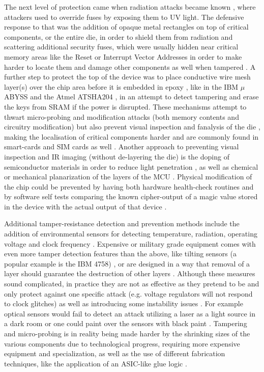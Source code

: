 The next level of protection came when radiation attacks became known \citep{sergei:thesis}, where attackers used to override fuses by exposing them to UV light. The defensive response to that was the addition of opaque metal rectangles on top of critical components, or the entire die, in order to shield them from radiation and scattering additional security fuses, which were usually hidden near critical memory areas like the Reset or Interrupt Vector Addresses in order to make harder to locate them and damage other components as well when tampered \citep{sergei:thesis} \citep{hwre}. A further step to protect the top of the device was to place conductive wire mesh layer(s) over the chip area before it is embedded in epoxy , like in the IBM $\mu$ABYSS \citep{website:ibm_secure} and the Atmel ATSHA204 \citep{hwre}, in an attempt to detect tampering and erase the keys from SRAM if the power is disrupted. These mechanisms attempt to thwart micro-probing and modification attacks (both memory contents and circuitry modification)  but also prevent visual inspection and fanalysis of the die \citep{hwre}, making the localisation of critical components harder and are commonly found in smart-cards \citep{sergei:thesis} and SIM cards as well \citep{hwre}. Another approach to preventing visual inspection and IR imaging (without de-layering the die) is the doping of semiconductor materials in order to reduce light penetration \citep{sergei:thesis}, as well as chemical or mechanical planarization of the layers of the MCU \citep{sergei:thesis} \citep{planarization_techniques}. Physical modification of the chip could be prevented by having both hardware health-check routines and by software self tests comparing the known cipher-output of a magic value stored in the device with the actual output of that device \citep{anderson:tamper_resistance}.

Additional tamper-resistance detection and prevention methods include the addition of environmental sensors for detecting temperature, radiation, operating voltage and clock frequency \citep{sergei:thesis}. Expensive or military grade equipment comes with even more tamper detection features than the above, like tilting sensors (a popular example is the IBM 4758) \citep{website:ibm_secure}, or are designed in a way that removal of a layer should guarantee the destruction of other layers \citep{anderson:cautionary_note}. Although these measures sound complicated, in practice they are not as effective as they pretend to be and only protect against one specific attack (e.g. voltage regulators will not respond to clock glitches) as well as introducing some instability issues \citep{anderson:cautionary_note}. For example optical sensors would fail to detect an attack utilizing a laser as a light source in a dark room \citep{hwre} or one could paint over the sensors with black paint \citep{sergei:thesis}. Tampering and micro-probing is in reality being made harder by the shrinking sizes of the various components due to technological progress, requiring more expensive equipment and specialization, as well as the use of different fabrication techniques, like the application of an ASIC-like glue logic \citep{sergei:thesis} \citep{hwre}.